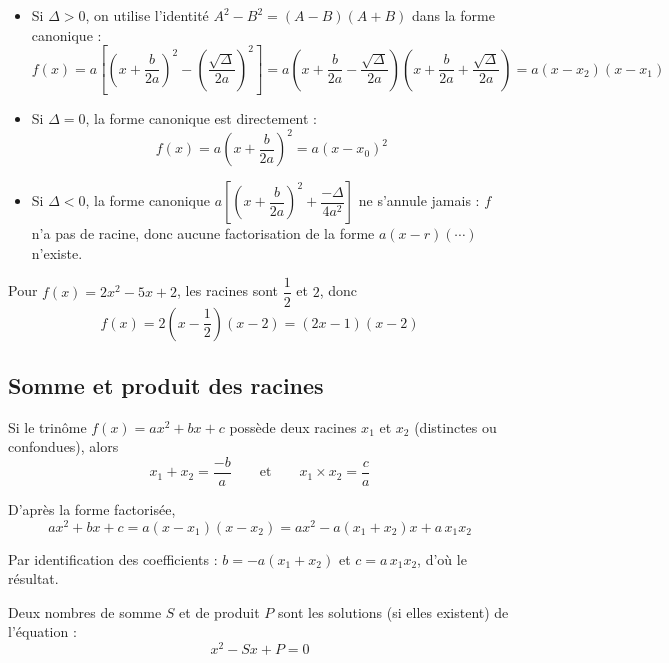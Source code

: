 \begin{demo}
	\nline
	\begin{itemize}
		\item Si $\Delta > 0$, on utilise l'identité $A^2 - B^2 = (A-B)(A+B)$ dans la forme canonique :
		      \[
			      f(x) = a \left[ \left(x + \frac{b}{2a}\right)^2 - \left(\frac{\sqrt{\Delta}}{2a}\right)^2 \right]
			      = a \left( x + \frac{b}{2a} - \frac{\sqrt{\Delta}}{2a} \right)\left( x + \frac{b}{2a} + \frac{\sqrt{\Delta}}{2a} \right)
			      = a(x - x_2)(x - x_1)
		      \]

		\item Si $\Delta = 0$, la forme canonique est directement :
		      \[
			      f(x) = a\left(x + \dfrac{b}{2a}\right)^2 = a(x - x_0)^2
		      \]

		\item Si $\Delta < 0$, la forme canonique $a\left[\left(x + \dfrac{b}{2a}\right)^2 + \dfrac{-\Delta}{4a^2}\right]$ ne s'annule jamais : $f$ n'a pas de racine, donc aucune factorisation de la forme $a(x - r)(\cdots)$ n'existe.
	\end{itemize}
\end{demo}

\begin{ex}
	Pour $f(x) = 2x^2 - 5x + 2$, les racines sont $\dfrac{1}{2}$ et $2$, donc
	\[
		f(x) = 2\left(x - \frac{1}{2}\right)(x - 2) = (2x - 1)(x - 2)
	\]
\end{ex}

\subsection{Somme et produit des racines}

\begin{prop}
	Si le trinôme $f(x) = ax^2 + bx + c$ possède deux racines $x_1$ et $x_2$ (distinctes ou confondues), alors
	\[
		x_1 + x_2 = \frac{-b}{a} \qquad \text{et} \qquad x_1 \times x_2 = \frac{c}{a}
	\]
\end{prop}

\begin{demo}
	D'après la forme factorisée,
	\[
		ax^2 + bx + c = a(x - x_1)(x - x_2) = ax^2 - a(x_1 + x_2)x + a\,x_1 x_2
	\]

	Par identification des coefficients : $b = -a(x_1 + x_2)$ et $c = a\,x_1 x_2$, d'où le résultat.
\end{demo}

\begin{methode}
	Deux nombres de somme $S$ et de produit $P$ sont les solutions (si elles existent) de l'équation :
	\[
		x^2 - Sx + P = 0
	\]
\end{methode}

